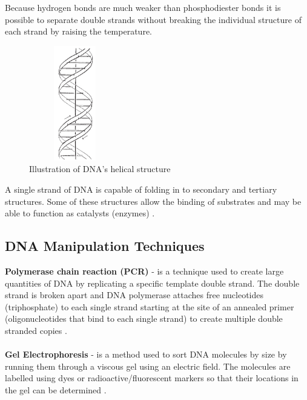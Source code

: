 \documentclass[11pt,a4paper,portrait]{article}
\begin{document}
Because hydrogen bonds are much weaker than phosphodiester bonds it is possible to separate double strands without breaking the individual structure of each strand by raising the temperature.
\clearpage
\begin{figure}[ht!]
\centering
\includegraphics[width=40mm, height=50mm]{helix.jpg}
\caption{Illustration of DNA's helical structure \cite{watsoncrick} \label{dnafig}}
\end{figure}

A single strand of DNA is capable of folding in to secondary and tertiary structures. Some of these structures allow the binding of substrates and may be able to function as catalysts (enzymes) \cite{dnaenzyme}.

\subsection{DNA Manipulation Techniques}
\textbf{Polymerase chain reaction (PCR)} -  is a technique used to create large quantities of DNA by replicating a specific template double strand. The double strand is broken apart and DNA polymerase attaches free nucleotides (triphosphate) to each single strand starting at the site of an annealed primer (oligonucleotides that bind to each single strand) to create multiple double stranded copies \cite{PCR}.
\\\\
\textbf{Gel Electrophoresis} - is a method used to sort DNA molecules by size by running them through a viscous gel using an electric field. The molecules are labelled using dyes or radioactive/fluorescent markers so that their locations in the gel can be determined \cite{dna}.
\end{document}
